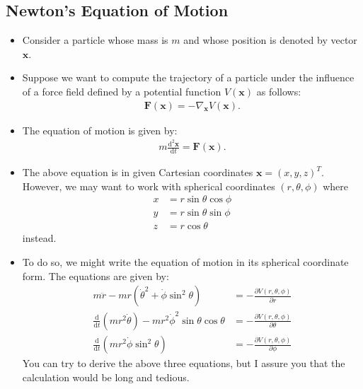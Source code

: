 \documentclass[10pt]{article}
\newcommand{\dee}{\mathrm{d}}
\newcommand{\ve}[1]{\mathbf{#1}}
\begin{document}
  \subsection{Newton's Equation of Motion}

  \begin{itemize}
  	\item Consider a particle whose mass is $m$ and whose position is denoted by vector $\ve{x}$.

  	\item Suppose we want to compute the trajectory of a particle under the influence of a force field defined by a potential function $V(\ve{x})$ as follows:
  	\begin{align*}
  		\ve{F}(\ve{x}) = -\nabla_{\ve{x}} V(\ve{x}).
  	\end{align*}

  	\item The equation of motion is given by:
  	\begin{align*}
  		m \frac{\dee^2 \ve{x}}{\dee t} = \ve{F}(\ve{x}).
  	\end{align*}

  	\item The above equation is in given Cartesian coordinates $\ve{x} = (x,y,z)^T$. However, we may want to work with spherical coordinates $(r,\theta,\phi)$ where
  	\begin{align*}
  		x &= r \sin\theta \cos\phi \\
  		y &= r \sin\theta \sin\phi \\
  		z &= r \cos\theta
  	\end{align*}
  	instead.

  	\item To do so, we might write the equation of motion in its spherical coordinate form. The equations are given by:
  	\begin{align}
  		m \ddot{r} - mr(\dot{\theta}^2 + \dot{\phi} \sin^2 \theta) 
  		&= -\frac{\partial V(r, \theta,\phi)}{\partial r} \label{newton-polar-1}\\
  		\frac{\dee}{\dee t} (mr^2 \dot{\theta}) - mr^2\dot{\phi}^2 \sin \theta \cos \theta 
  		&= -\frac{\partial V(r, \theta,\phi)}{\partial \theta} \label{newton-polar-2} \\
  		\frac{\dee}{\dee t} (mr^2 \dot{\phi} \sin^2 \theta)
  		&= -\frac{\partial V(r, \theta,\phi)}{\partial \phi} \label{newton-polar-3}
  	\end{align}
  	You can try to derive the above three equations, but I assure you that the calculation would be long and tedious.


\end{itemize}
\end{document}
